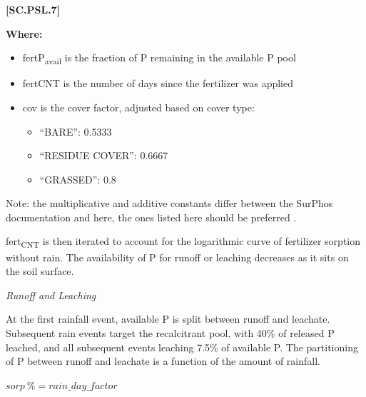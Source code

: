             {\raggedleft \textbf{[SC.PSL.7]}\par}
            \vspace{0.5cm}

        \textbf{Where:}
            
        \begin{itemize}
            \item fertP\textsubscript{avail} is the fraction of P remaining in the available P pool
            \item fertCNT	is the number of days since the fertilizer was applied
            \item cov is the cover factor, adjusted based on cover type: 
            \begin{itemize}
                \item “BARE”: 0.5333
                \item “RESIDUE COVER”: 0.6667
                \item “GRASSED”: 0.8
            \end{itemize}
        \end{itemize}
        \vspace{0.2cm}

    \begin{tcolorbox}[colback=white, colframe=black, boxrule=0.5pt, arc=3pt, width=\textwidth]
Note: the multiplicative and additive constants differ between the SurPhos documentation and here, the ones listed here should be preferred \parencite{vadas2007}.
\end{tcolorbox}
\vspace{0.2cm}

fert\textsubscript{CNT} is then iterated to account for the logarithmic curve of fertilizer sorption without rain. The availability of P for runoff or leaching decreases as it sits on the soil surface.
\vspace{0.3cm}

\textit{Runoff and Leaching}
\vspace{0.2cm}     

At the first rainfall event, available P is split between runoff and leachate. Subsequent rain events target the recalcitrant pool, with 40\% of released P leached, and all subsequent events leaching 7.5\% of available P. The partitioning of P between runoff and leachate is a function of the amount of rainfall.
\vspace{0.2cm}
        
    \begin{center}
\(sorp\ \% = rain\_day\_factor\)

    \end{center}
        \vspace{0.5cm} 
    
